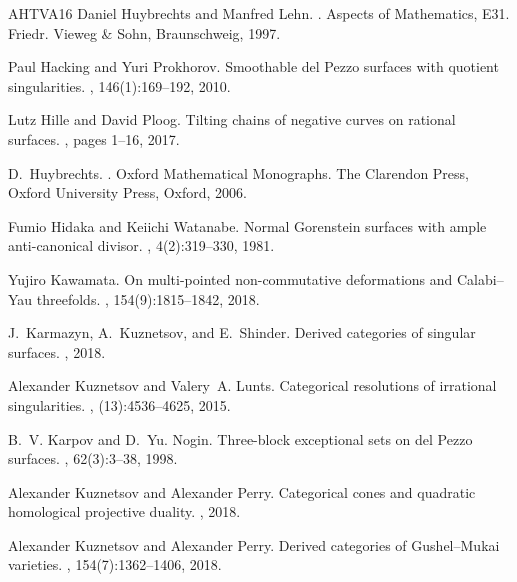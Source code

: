 \documentclass[11pt]{amsart}
\theoremstyle{plain}
\theoremstyle{definition}
\theoremstyle{remark}
\begin{document}
\begin{thebibliography}{AHTVA16}
Daniel Huybrechts and Manfred Lehn.
.
\newblock Aspects of Mathematics, E31. Friedr. Vieweg \& Sohn, Braunschweig,
  1997.

Paul Hacking and Yuri Prokhorov.
\newblock Smoothable del {P}ezzo surfaces with quotient singularities.
, 146(1):169--192, 2010.

Lutz Hille and David Ploog.
\newblock Tilting chains of negative curves on rational surfaces.
, pages 1--16, 2017.

D.~Huybrechts.
.
\newblock Oxford Mathematical Monographs. The Clarendon Press, Oxford
  University Press, Oxford, 2006.

Fumio Hidaka and Keiichi Watanabe.
\newblock Normal {G}orenstein surfaces with ample anti-canonical divisor.
, 4(2):319--330, 1981.

Yujiro Kawamata.
\newblock On multi-pointed non-commutative deformations and {C}alabi--{Y}au
  threefolds.
, 154(9):1815--1842, 2018.

J.~{Karmazyn}, A.~{Kuznetsov}, and E.~{Shinder}.
\newblock Derived categories of singular surfaces.
, 2018.

Alexander Kuznetsov and Valery~A. Lunts.
\newblock Categorical resolutions of irrational singularities.
, (13):4536--4625, 2015.

B.~V. Karpov and D.~Yu. Nogin.
\newblock Three-block exceptional sets on del {P}ezzo surfaces.
, 62(3):3--38, 1998.

Alexander Kuznetsov and Alexander Perry.
\newblock Categorical cones and quadratic homological projective duality.
, 2018.

Alexander Kuznetsov and Alexander Perry.
\newblock Derived categories of {G}ushel--{M}ukai varieties.
, 154(7):1362--1406, 2018.


\end{thebibliography}
\end{document}
